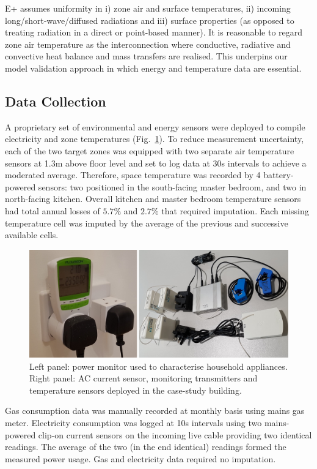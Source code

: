 \documentclass[preprint,12pt, sort&compress]{elsarticle}
\begin{document}
E+ assumes uniformity in i) zone air and surface temperatures, ii) incoming long/short-wave/diffused radiations and iii) surface properties (as opposed to treating radiation in a direct or point-based manner). It is reasonable to regard zone air temperature as the interconnection where conductive, radiative and convective heat balance and mass transfers are realised. This underpins our model validation approach in which energy and temperature data are essential.


\subsection{Data Collection}
A proprietary set of environmental and energy sensors were deployed to compile electricity and zone temperatures (Fig.~\ref{Fig_Pic1}). To reduce measurement uncertainty, each of the two target zones was equipped with two separate air temperature sensors at 1.3m above floor level and set to log data at 30s intervals to achieve a moderated average. Therefore, space temperature was recorded by 4 battery-powered sensors: two positioned in the south-facing master bedroom, and two in north-facing kitchen. Overall kitchen and master bedroom temperature sensors had total annual losses of $5.7\%$ and $2.7\%$ that required imputation. Each missing temperature cell was imputed by the average of the previous and successive available cells. 

\begin{figure}
\includegraphics[width=\textwidth]{Pictures/Building/Picture1}
\caption{Left panel: power monitor used to characterise household appliances. Right panel: AC current sensor, monitoring transmitters and temperature sensors deployed in the case-study building.}
\label{Fig_Pic1}
\end{figure}

Gas consumption data was manually recorded at monthly basis using mains gas meter. Electricity consumption was logged at 10s intervals using two mains-powered clip-on current sensors on the incoming live cable providing two identical readings. The average of the two (in the end identical) readings formed the measured power usage. Gas and electricity data required no imputation.
\end{document}
